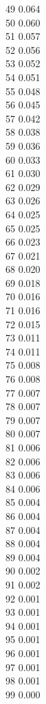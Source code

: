 { 49	0.064 \\
 50	0.060 \\
 51	0.057 \\
 52	0.056 \\
 53	0.052 \\
 54	0.051 \\
 55	0.048 \\
 56	0.045 \\
 57	0.042 \\
 58	0.038 \\
 59	0.036 \\
 60	0.033 \\
 61	0.030 \\
 62	0.029 \\
 63	0.026 \\
 64	0.025 \\
 65	0.025 \\
 66	0.023 \\
 67	0.021 \\
 68	0.020 \\
 69	0.018 \\
 70	0.016 \\
 71	0.016 \\
 72	0.015 \\
 73	0.011 \\
 74	0.011 \\
 75	0.008 \\
 76	0.008 \\
 77	0.007 \\
 78	0.007 \\
 79	0.007 \\
 80	0.007 \\
 81	0.006 \\
 82	0.006 \\
 83	0.006 \\
 84	0.006 \\
 85	0.004 \\
 86	0.004 \\
 87	0.004 \\
 88	0.004 \\
 89	0.004 \\
 90	0.002 \\
 91	0.002 \\
 92	0.001 \\
 93	0.001 \\
 94	0.001 \\
 95	0.001 \\
 96	0.001 \\
 97	0.001 \\
 98	0.001 \\
 99	0.000 \\
}
